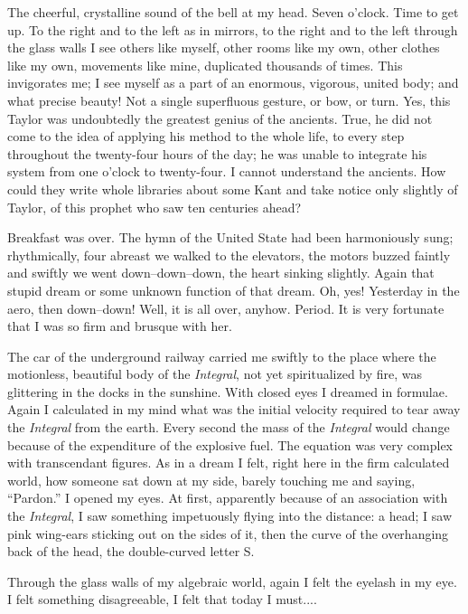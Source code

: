 \documentclass[11pt,openany]{book}
\begin{document}
The cheerful, crystalline sound of the bell at my head. Seven o'clock. Time to get up. To the right and to the left as in mirrors, to the right and to the left through the glass walls I see others like myself, other rooms like my own, other clothes like my own, movements like mine, duplicated thousands of times. This invigorates me; I see myself as a part of an enormous, vigorous, united body; and what precise beauty! Not a single superfluous gesture, or bow, or turn. Yes, this Taylor was undoubtedly the greatest genius of the ancients. True, he did not come to the idea of applying his method to the whole life, to every step throughout the twenty-four hours of the day; he was unable to integrate his system from one o'clock to twenty-four. I cannot understand the ancients. How could they write whole libraries about some Kant and take notice only slightly of Taylor, of this prophet who saw ten centuries ahead?

Breakfast was over. The hymn of the United State had been harmoniously sung; rhythmically, four abreast we walked to the elevators, the motors buzzed faintly and swiftly we went down--down--down, the heart sinking slightly. Again that stupid dream or some unknown function of that dream. Oh, yes! Yesterday in the aero, then down--down! Well, it is all over, anyhow. Period. It is very fortunate that I was so firm and brusque with her.

The car of the underground railway carried me swiftly to the place where the motionless, beautiful body of the \emph{Integral}, not yet spiritualized by fire, was glittering in the docks in the sunshine. With closed eyes I dreamed in formulae. Again I calculated in my mind what was the initial velocity required to tear away the \emph{Integral} from the earth. Every second the mass of the \emph{Integral} would change because of the expenditure of the explosive fuel. The equation was very complex with transcendant figures. As in a dream I felt, right here in the firm calculated world, how someone sat down at my side, barely touching me and saying, ``Pardon.'' I opened my eyes. At first, apparently because of an association with the \emph{Integral}, I saw something impetuously flying into the distance: a head; I saw pink wing-ears sticking out on the sides of it, then the curve of the overhanging back of the head, the double-curved letter S.

Through the glass walls of my algebraic world, again I felt the eyelash in my eye. I felt something disagreeable, I felt that today I must....
\end{document}
